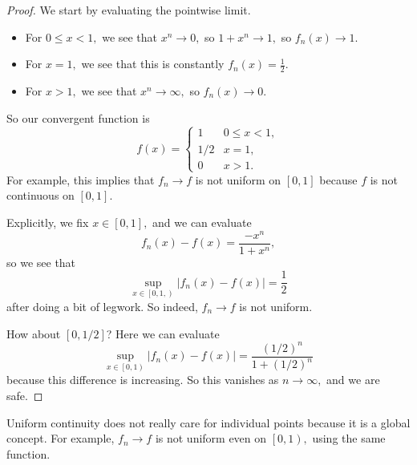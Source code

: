\documentclass[../notes.tex]{subfiles}
\begin{document}
\begin{proof}
	We start by evaluating the pointwise limit.
	\begin{itemize}
		\item For $0\le x<1,$ we see that $x^n\to0,$ so $1+x^n\to1,$ so $f_n(x)\to 1.$
		\item For $x=1,$ we see that this is constantly $f_n(x)=\frac12.$
		\item For $x>1,$ we see that $x^n\to\infty,$ so $f_n(x)\to0.$
	\end{itemize}
	So our convergent function is
	\[f(x)=\begin{cases}
		1 & 0\le x<1, \\
		1/2 & x=1, \\
		0 & x>1.
	\end{cases}\]
	For example, this implies that $f_n\to f$ is not uniform on $[0,1]$ because $f$ is not continuous on $[0,1].$

	Explicitly, we fix $x\in\left[0,1\right],$ and we can evaluate
	\[f_n(x)-f(x)=\frac{-x^n}{1+x^n},\]
	so we see that
	\[\sup_{x\in\left[0,1,\right)}\left|f_n(x)-f(x)\right|=\frac12\]
	after doing a bit of legwork. So indeed, $f_n\to f$ is not uniform.

	How about $[0,1/2]$? Here we can evaluate
	\[\sup_{x\in\left[0,1\right)}|f_n(x)-f(x)|=\frac{(1/2)^n}{1+(1/2)^n}\]
	because this difference is increasing. So this vanishes as $n\to\infty,$ and we are safe.
\end{proof}
\begin{remark}
	Uniform continuity does not really care for individual points because it is a global concept. For example, $f_n\to f$ is not uniform even on $\left[0,1\right),$ using the same function.
\end{remark}
\end{document}
